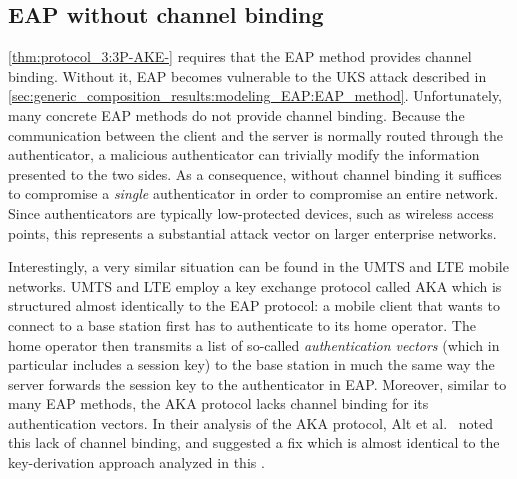  



\subsection{EAP without channel binding}\label{sec:EAP:without_channel_binding}

\cref{thm:protocol_3:3P-AKE-} requires that the EAP method provides channel binding.
Without it,
EAP  becomes vulnerable to the UKS attack described in \cref{sec:generic_composition_results:modeling_EAP:EAP_method}.
Unfortunately,
many concrete EAP methods do not provide channel binding.
Because the communication between the client and the server is normally routed through the authenticator,
a malicious authenticator can trivially modify the information presented to the two sides. 
As a consequence,
without channel binding it suffices to compromise a \emph{single} authenticator in order to compromise an entire network. 
Since authenticators are typically low-protected devices,
such as wireless access points,
this represents  a substantial attack vector on larger enterprise networks.


Interestingly,
a very similar situation can be found in the  UMTS and LTE mobile networks.
UMTS and LTE employ a key exchange protocol called AKA which is structured almost identically to the EAP protocol:
a mobile client that wants to connect to a base station first has to authenticate to its home operator.
The home operator then transmits a list of so-called \emph{authentication vectors}
(which in particular includes a session key) to the base station in much the same way the server forwards the session key to the authenticator in EAP.  
Moreover,
similar to many EAP methods,
the AKA protocol lacks channel binding for its authentication vectors. 
In their analysis of the AKA protocol,
Alt et al.~\cite[§5]{ACNS:AFMOR16} noted this lack of channel binding,
and suggested a fix which is almost identical to the key-derivation approach analyzed in this . 


